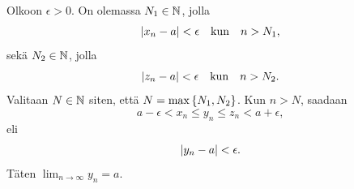 \documentclass[12pt,a4paper]{article}
\begin{document}
\begin{solution}
  Olkoon \(\epsilon > 0\). On olemassa \(N_1 \in \mathbb{N}\), jolla
  \[
    \lvert x_n - a\rvert < \epsilon \quad \text{kun} \quad n > N_1,
  \]
  sekä \(N_2 \in \mathbb{N}\), jolla
  \[
    \lvert z_n - a\rvert < \epsilon \quad \text{kun} \quad n > N_2.
  \]
  Valitaan \(N \in \mathbb{N}\) siten, että \(N = \max\left\lbrace N_1, N_2\right\rbrace\). Kun
  \(n > N\), saadaan
  \[
    a - \epsilon < x_n \leq y_n \leq z_n < a + \epsilon,
  \]
  eli
  \[
    \lvert y_n - a\rvert < \epsilon.
  \]
  Täten \(\lim_{n \to \infty} y_n = a\).
\end{solution}
\end{document}
